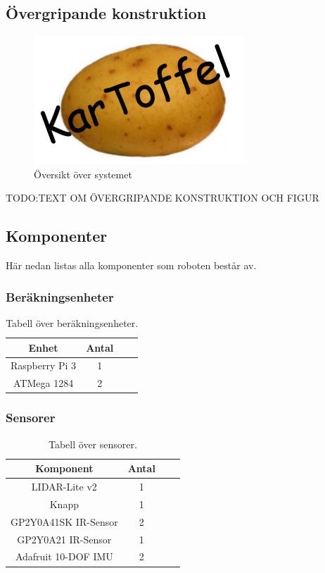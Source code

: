 \documentclass{article}
\begin{document}
\subsection{Övergripande konstruktion}
\begin{figure}[H]
\centering
\includegraphics[scale=0.4]{Logo}
\caption{Översikt över systemet}
\label{fig:oversikt_systemet3}
\end{figure}

TODO:TEXT OM ÖVERGRIPANDE KONSTRUKTION OCH FIGUR

\subsection{Komponenter}
Här nedan listas alla komponenter som roboten består av.

\subsubsection{Beräkningsenheter}
\begin{table}[H]
  \centering
  \begin{tabular}{ | c | c | c | c |}
    \hline
    \textbf{Enhet} & \textbf{Antal} \\
    \hline
    Raspberry Pi 3 & 1 \\
    \hline
    ATMega 1284 & 2 \\
    \hline
  \end{tabular}
  \caption{ Tabell över beräkningsenheter. }
\end{table}

\subsubsection{Sensorer}
\begin{table}[H]
  \centering
  \begin{tabular}{ | c | c | c | c |}
    \hline
    \textbf{Komponent} & \textbf{Antal} \\
    \hline
    LIDAR-Lite v2 & 1 \\
    \hline
    Knapp & 1 \\
    \hline
    GP2Y0A41SK IR-Sensor & 2 \\
    \hline
    GP2Y0A21 IR-Sensor & 1 \\
    \hline
    Adafruit 10-DOF IMU & 2 \\
    \hline
  \end{tabular}
  \caption{ Tabell över sensorer. }
\end{table}
\end{document}
